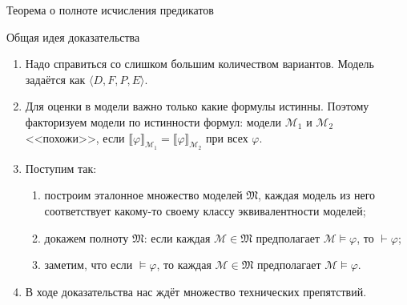 \documentclass[aspectratio=169]{beamer}
\begin{document}
\begin{frame}
\begin{center}\LARGE Теорема о полноте исчисления предикатов\end{center}
\end{frame}

\begin{frame}{Общая идея доказательства}
\begin{enumerate}
\item Надо справиться со слишком большим количеством вариантов.
      Модель задаётся как $\langle D,F,P,E \rangle$.\pause
\item Для оценки в модели важно только какие формулы истинны. Поэтому факторизуем модели по истинности формул:
      модели $\mathcal{M}_1$ и $\mathcal{M}_2$ <<похожи>>, если
      $\llbracket \varphi \rrbracket_{\mathcal{M}_1} = \llbracket \varphi \rrbracket_{\mathcal{M}_2}$
      при всех $\varphi$.\pause
\item Поступим так:
    \begin{enumerate}
       \item построим эталонное множество моделей $\mathfrak{M}$, каждая модель из него соответствует какому-то своему классу эквивалентности моделей;\pause
       \item докажем полноту $\mathfrak{M}$: если каждая $\mathcal{M} \in \mathfrak{M}$ предполагает $\mathcal{M}\models\varphi$,
             то $\vdash\varphi$;\pause
       \item заметим, что если $\models\varphi$, то каждая $\mathcal{M} \in \mathfrak{M}$ предполагает $\mathcal{M}\models\varphi$.\pause
    \end{enumerate}
\item В ходе доказательства нас ждёт множество технических препятствий.
\end{enumerate}
\end{frame}
\end{document}
